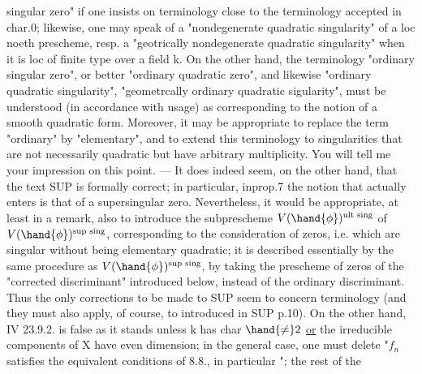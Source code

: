 
singular zero" if one insists on terminology
close to the terminology accepted in char.0; likewise, one may
speak of a "nondegenerate quadratic singularity" of a loc
noeth prescheme, resp. a "geotrically nondegenerate quadratic singularity" when it is
loc of finite type over a field k. On the other hand, the terminology
"ordinary singular zero", or better "ordinary quadratic zero",
and likewise "ordinary quadratic singularity", "geometrcally ordinary quadratic sigularity",
must be understood (in accordance with usage)
as corresponding to the notion of a smooth quadratic form. Moreover,
it may be appropriate to replace the term "ordinary" by "elementary",
and to extend this terminology to singularities that are not necessarily
quadratic but have arbitrary multiplicity. You will tell me your impression
on this point. --- It does indeed seem, on the other hand, that the text SUP is
formally correct; in particular, in\hand{/}prop.7 the notion that actually enters
is that of a supersingular zero. Nevertheless, it would be appropriate,
at least in a remark, also to introduce  the subprescheme
$V(\hand{\phi})^{\text{ult sing}}$ of $V(\hand{\phi})^{\text{sup sing}}$, corresponding to the consideration
of  zeros, i.e.  which are singular without being
elementary quadratic; it is described essentially by the same
procedure as $V(\hand{\phi})^{\text{sup sing}}$, by taking the prescheme of zeros of the
"corrected discriminant" introduced below, instead of the ordinary
discriminant. Thus the only corrections to be made to SUP seem to concern
terminology (and they must also apply, of course, to 
introduced in SUP p.10\hand{/}). On the other hand, IV 23.9.2. is false as it stands
unless k has char $\hand{\neq} 2$ \uline{or} the irreducible components of X have
even dimension; in the general case, one must delete "$f_n$ satisfies
the equivalent conditions of 8.8., in particular "; the rest of the

